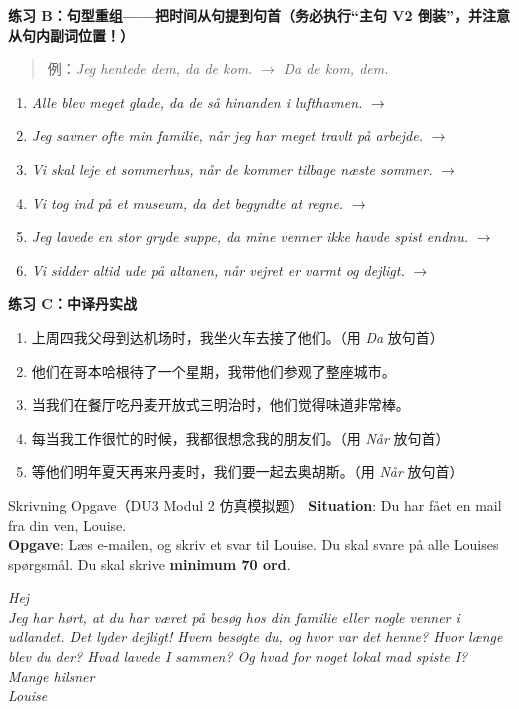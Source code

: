 \textbf{练习 B：句型重组——把时间从句提到句首（务必执行“主句 V2 倒装”，并注意从句内副词位置！）}
\begin{quote}
\small 例：\textit{Jeg hentede dem, da de kom.} $\rightarrow$ \textit{Da de kom,  dem.}
\end{quote}
\begin{enumerate}
  \item \textit{Alle blev meget glade, da de så hinanden i lufthavnen.} $\rightarrow$
  \item \textit{Jeg savner ofte min familie, når jeg har meget travlt på arbejde.} $\rightarrow$
  \item \textit{Vi skal leje et sommerhus, når de kommer tilbage næste sommer.} $\rightarrow$
  \item \textit{Vi tog ind på et museum, da det begyndte at regne.} $\rightarrow$
  \item \textit{Jeg lavede en stor gryde suppe, da mine venner ikke havde spist endnu.} $\rightarrow$
  \item \textit{Vi sidder altid ude på altanen, når vejret er varmt og dejligt.} $\rightarrow$
\end{enumerate}

\textbf{练习 C：中译丹实战}
\begin{enumerate}
  \item 上周四我父母到达机场时，我坐火车去接了他们。（用 \textit{Da} 放句首）
  \item 他们在哥本哈根待了一个星期，我带他们参观了整座城市。
  \item 当我们在餐厅吃丹麦开放式三明治时，他们觉得味道非常棒。
  \item 每当我工作很忙的时候，我都很想念我的朋友们。（用 \textit{Når} 放句首）
  \item 等他们明年夏天再来丹麦时，我们要一起去奥胡斯。（用 \textit{Når} 放句首）
\end{enumerate}


\begin{emailbox}{Skrivning Opgave（DU3 Modul 2 仿真模拟题）}
\textbf{Situation}: Du har fået en mail fra din ven, Louise.\\
\textbf{Opgave}: Læs e-mailen, og skriv et svar til Louise. Du skal svare på alle Louises spørgsmål. Du skal skrive \textbf{minimum 70 ord}.

\vspace{0.3em}
\textit{Hej\\
Jeg har hørt, at du har været på besøg hos din familie eller nogle venner i udlandet. Det lyder dejligt! Hvem besøgte du, og hvor var det henne? Hvor længe blev du der? Hvad lavede I sammen? Og hvad for noget lokal mad spiste I?\\
Mange hilsner\\
Louise}
\end{emailbox}

